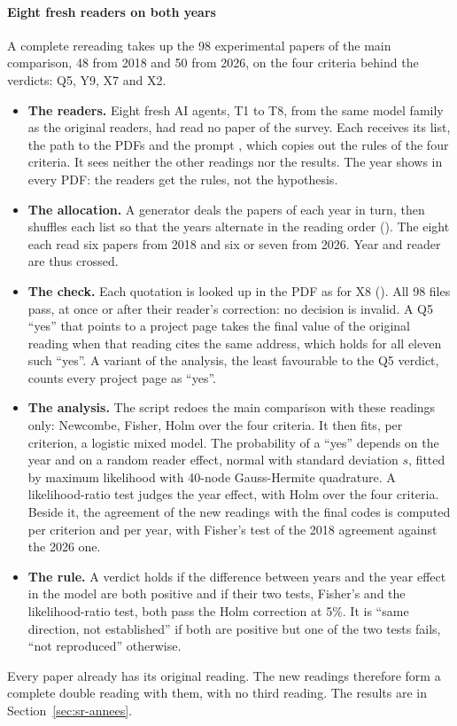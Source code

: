 \paragraph{Eight fresh readers on both years}
A complete rereading takes up the 98 experimental papers of the main comparison, 48 from 2018 and 50
from 2026, on the four criteria behind the verdicts: Q5, Y9, X7 and X2.
\begin{itemize}
  \item \textbf{The readers.} Eight fresh AI agents, T1 to T8, from the same model family as the
  original readers, had read no paper of the survey. Each receives its list, the path to the PDFs and the prompt
  , which copies out the rules of the four criteria. It sees neither the other readings nor the results. The year shows in every PDF: the readers
  get the rules, not the hypothesis.
  \item \textbf{The allocation.} A  generator deals the papers of each year
  in turn, then shuffles each list so that the years alternate in the reading order
  (). The eight each read six papers from 2018 and six or seven from 2026.
  Year and reader are thus crossed.
  \item \textbf{The check.} Each quotation is looked up in the PDF as for X8
  (). All 98 files pass, at once or after their reader's correction: no
  decision is invalid. A Q5 \enquote{yes} that points to a project page takes the final value of the
  original reading when that reading cites the same address, which holds for all eleven such \enquote{yes}. A variant of the analysis, the least favourable to the Q5 verdict, counts every project page as \enquote{yes}.
  \item \textbf{The analysis.} The script  redoes the main comparison with
  these readings only: Newcombe, Fisher, Holm over the four criteria. It then fits, per criterion, a
  logistic mixed model. The probability of a \enquote{yes} depends on the year and on a random reader
  effect, normal with standard deviation $s$, fitted by maximum likelihood with 40-node Gauss-Hermite
  quadrature. A likelihood-ratio test judges the year effect, with Holm over the four criteria.
  Beside it, the agreement of the new readings with the final codes is computed per criterion and per
  year, with Fisher's test of the 2018 agreement against the 2026 one.
  \item \textbf{The rule.} A verdict holds if the difference between years and the
  year effect in the model are both positive and if their two tests, Fisher's and the likelihood-ratio
  test, both pass the Holm correction at 5\%. It is \enquote{same
  direction, not established} if both are positive but one of the two tests fails, \enquote{not
  reproduced} otherwise.
\end{itemize}
Every paper already has its original reading. The new readings therefore form a complete double
reading with them, with no third reading. The results are in Section~\ref{sec:sr-annees}.

